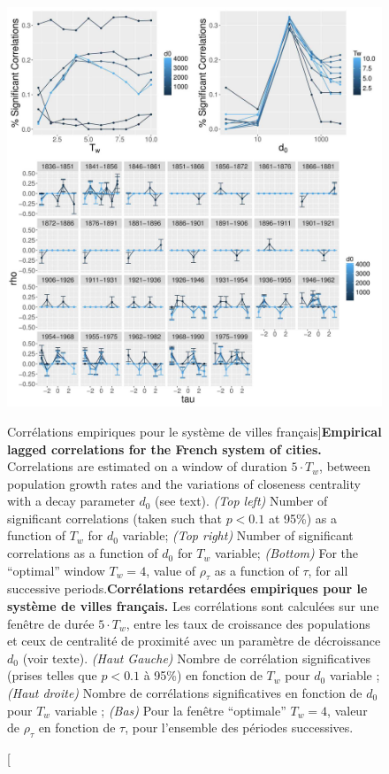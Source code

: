 \begin{figure}
	\includegraphics[width=\linewidth]{Figures/Final/6-2-3-fig-macrocoevol-empirical.jpg}
	\caption[Empirical lagged correlations for the French system of cities][Corrélations empiriques pour le système de villes français]{\textbf{Empirical lagged correlations for the French system of cities.} Correlations are estimated on a window of duration $5\cdot T_w$, between population growth rates and the variations of closeness centrality with a decay parameter $d_0$ (see text). \textit{(Top left)} Number of significant correlations (taken such that $p<0.1$ at 95\%) as a function of $T_w$ for $d_0$ variable; \textit{(Top right)} Number of significant correlations as a function of $d_0$ for $T_w$ variable; \textit{(Bottom)} For the ``optimal'' window $T_w = 4$, value of $\rho_{\tau}$ as a function of $\tau$, for all successive periods.\label{fig:macrocoevol:empirical}}{\textbf{Corrélations retardées empiriques pour le système de villes français.} Les corrélations sont calculées sur une fenêtre de durée $5\cdot T_w$, entre les taux de croissance des populations et ceux de centralité de proximité avec un paramètre de décroissance $d_0$ (voir texte). \textit{(Haut Gauche)} Nombre de corrélation significatives (prises telles que $p<0.1$ à 95\%) en fonction de $T_w$ pour $d_0$ variable ; \textit{(Haut droite)} Nombre de corrélations significatives en fonction de $d_0$ pour $T_w$ variable ; \textit{(Bas)} Pour la fenêtre ``optimale'' $T_w=4$, valeur de $\rho_{\tau}$ en fonction de $\tau$, pour l'ensemble des périodes successives.\label{fig:macrocoevol:empirical}}
\end{figure}
